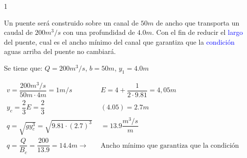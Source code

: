 \documentclass[11pt, oneside]{article}
\begin{document}
\begin{eje}{}{1}

    Un puente será construido sobre un canal de $50m$ de ancho que transporta un caudal de $200m^{3}/s$ con una profundidad de $4.0m$. Con el fin de reducir el \textcolor{blue}{largo} del puente, cual es el ancho mínimo del canal que garantiza que la \textcolor{blue}{condición} aguas arriba del puente no cambiará. \vspace{2ex}


    Se tiene que: $Q=200m^{3}/s$, $b=50m$, $y_1=4.0m$

    \begin{equation}
        \begin{aligned}
            v=\dfrac{200 m^3/s}{50m \cdot 4m}=1m/s \qquad &E=4+\dfrac{1}{2\cdot9.81}=4,05m\\
            y_{c}=\dfrac{2}{3}E=\dfrac{2}{3}&(4.05)=2.7m\\
            q=\sqrt{gy^{3}_{c}}=\sqrt{9.81\cdot(2.7)^{3}}&=13.9 \dfrac{m^{3}/s}{m}\\
            q=\dfrac{Q}{B_c}=\dfrac{200}{13.9}=14.4m \rightarrow \quad &\text{Ancho mínimo que garantiza que la condición a.arriba no cambie}    
        \end{aligned} 
    \nonumber
    \end{equation}
    

\end{eje}
\end{document}
